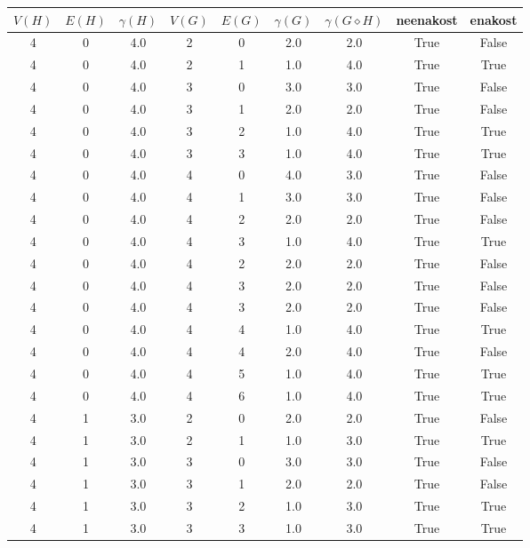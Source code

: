\documentclass[a4paper,12pt]{article}
\begin{document}
\begin{center}
    \begin{tabular}{ c c c | c c c | c | c | c}
        $V(H)$ & $E(H)$ & $\gamma(H)$ & $V(G)$ & $E(G)$ & $\gamma(G)$ & $\gamma(G \diamond H)$ & neenakost & enakost \\
        \hline
        4 & 0 & 4.0 & 2 & 0 & 2.0 & 2.0 & True & False    \\
        4 & 0 & 4.0 & 2 & 1 & 1.0 & 4.0 & True & True     \\
        4 & 0 & 4.0 & 3 & 0 & 3.0 & 3.0 & True & False    \\
        4 & 0 & 4.0 & 3 & 1 & 2.0 & 2.0 & True & False    \\
        4 & 0 & 4.0 & 3 & 2 & 1.0 & 4.0 & True & True     \\
        4 & 0 & 4.0 & 3 & 3 & 1.0 & 4.0 & True & True     \\
        4 & 0 & 4.0 & 4 & 0 & 4.0 & 3.0 & True & False    \\
        4 & 0 & 4.0 & 4 & 1 & 3.0 & 3.0 & True & False    \\
        4 & 0 & 4.0 & 4 & 2 & 2.0 & 2.0 & True & False    \\
        4 & 0 & 4.0 & 4 & 3 & 1.0 & 4.0 & True & True     \\
        4 & 0 & 4.0 & 4 & 2 & 2.0 & 2.0 & True & False    \\
        4 & 0 & 4.0 & 4 & 3 & 2.0 & 2.0 & True & False    \\
        4 & 0 & 4.0 & 4 & 3 & 2.0 & 2.0 & True & False    \\
        4 & 0 & 4.0 & 4 & 4 & 1.0 & 4.0 & True & True     \\
        4 & 0 & 4.0 & 4 & 4 & 2.0 & 4.0 & True & False    \\
        4 & 0 & 4.0 & 4 & 5 & 1.0 & 4.0 & True & True     \\
        4 & 0 & 4.0 & 4 & 6 & 1.0 & 4.0 & True & True     \\
        4 & 1 & 3.0 & 2 & 0 & 2.0 & 2.0 & True & False    \\
        4 & 1 & 3.0 & 2 & 1 & 1.0 & 3.0 & True & True     \\
        4 & 1 & 3.0 & 3 & 0 & 3.0 & 3.0 & True & False    \\
        4 & 1 & 3.0 & 3 & 1 & 2.0 & 2.0 & True & False    \\
        4 & 1 & 3.0 & 3 & 2 & 1.0 & 3.0 & True & True     \\
        4 & 1 & 3.0 & 3 & 3 & 1.0 & 3.0 & True & True     \\

\end{tabular}
\end{center}
\end{document}
